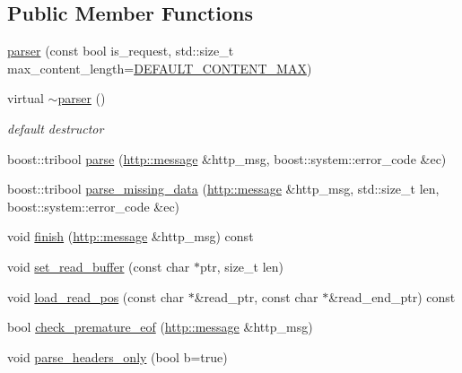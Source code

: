 \subsection*{Public Member Functions}
\begin{DoxyCompactItemize}
\item 
\hyperlink{classpion_1_1http_1_1parser_a33fe9cfd9bcae8868b817332d38a9261}{parser} (const bool is\-\_\-request, std\-::size\-\_\-t max\-\_\-content\-\_\-length=\hyperlink{classpion_1_1http_1_1parser_a77d2e93061f62e1b7028c783145adf22}{D\-E\-F\-A\-U\-L\-T\-\_\-\-C\-O\-N\-T\-E\-N\-T\-\_\-\-M\-A\-X})
\item 
virtual \hyperlink{classpion_1_1http_1_1parser_ac9df3da159b11389dba00e222410a599}{$\sim$parser} ()
\begin{DoxyCompactList}\small\item\em default destructor \end{DoxyCompactList}\item 
boost\-::tribool \hyperlink{classpion_1_1http_1_1parser_aead5bbb8da80c78bc2de3c264e4ace9c}{parse} (\hyperlink{classpion_1_1http_1_1message}{http\-::message} \&http\-\_\-msg, boost\-::system\-::error\-\_\-code \&ec)
\item 
boost\-::tribool \hyperlink{classpion_1_1http_1_1parser_ae77669284c876d7b107ba30a78af6d02}{parse\-\_\-missing\-\_\-data} (\hyperlink{classpion_1_1http_1_1message}{http\-::message} \&http\-\_\-msg, std\-::size\-\_\-t len, boost\-::system\-::error\-\_\-code \&ec)
\item 
void \hyperlink{classpion_1_1http_1_1parser_afcf9b52d540f78af9177642a5c571362}{finish} (\hyperlink{classpion_1_1http_1_1message}{http\-::message} \&http\-\_\-msg) const 
\item 
void \hyperlink{classpion_1_1http_1_1parser_a71fdd1e6e681a3bd932baf2bd6a9f9c9}{set\-\_\-read\-\_\-buffer} (const char $\ast$ptr, size\-\_\-t len)
\item 
void \hyperlink{classpion_1_1http_1_1parser_a3feba34ee7fb1c4f59dda5c1e58d3d82}{load\-\_\-read\-\_\-pos} (const char $\ast$\&read\-\_\-ptr, const char $\ast$\&read\-\_\-end\-\_\-ptr) const 
\item 
bool \hyperlink{classpion_1_1http_1_1parser_ad41eedba2dd5977ffddb1bc65dddc8fc}{check\-\_\-premature\-\_\-eof} (\hyperlink{classpion_1_1http_1_1message}{http\-::message} \&http\-\_\-msg)
\item 
void \hyperlink{classpion_1_1http_1_1parser_a1f7f084f396c9c912d65426883b33a38}{parse\-\_\-headers\-\_\-only} (bool b=true)
\item 

\end{DoxyCompactItemize}
